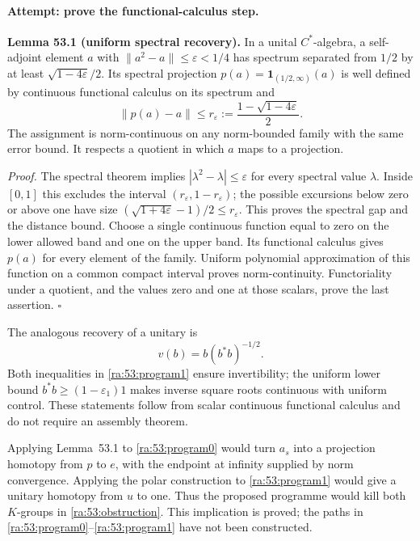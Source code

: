 \documentclass[11pt]{article}
\begin{document}
\paragraph{Attempt: prove the functional-calculus step.}
\textbf{Lemma 53.1 (uniform spectral recovery).} In a unital
$C^*$-algebra, a self-adjoint element $a$ with
$\|a^2-a\|\le\varepsilon<1/4$ has spectrum separated from $1/2$ by at
least $\sqrt{1-4\varepsilon}/2$. Its spectral projection
$p(a)=\mathbf1_{(1/2,\infty)}(a)$ is well defined by continuous
functional calculus on its spectrum and
\begin{equation}\label{ra:53:recovery}
 \|p(a)-a\|\le
 r_\varepsilon:=\frac{1-\sqrt{1-4\varepsilon}}2.
\end{equation}
The assignment is norm-continuous on any norm-bounded family with the
same error bound. It respects a quotient in which $a$ maps to a projection.

\textit{Proof.} The spectral theorem implies
$|\lambda^2-\lambda|\le\varepsilon$ for every spectral value $\lambda$.
Inside $[0,1]$ this excludes the interval
$(r_\varepsilon,1-r_\varepsilon)$; the possible excursions below zero
or above one have size
$(\sqrt{1+4\varepsilon}-1)/2\le r_\varepsilon$.
This proves the spectral gap and the distance bound. Choose a single
continuous function equal to zero on the lower allowed band and one on
the upper band. Its functional calculus gives $p(a)$ for every element
of the family. Uniform polynomial approximation of this function on a
common compact interval proves norm-continuity. Functoriality under a
quotient, and the values zero and one at those scalars, prove the last
assertion. \hfill$\square$

The analogous recovery of a unitary is
\[
 v(b)=b(b^*b)^{-1/2}.
\]
Both inequalities in \eqref{ra:53:program1} ensure invertibility; the
uniform lower bound $b^*b\ge(1-\varepsilon_1)1$ makes inverse square roots
continuous with uniform control. These statements follow from scalar
continuous functional calculus and do not require an assembly theorem.

Applying Lemma~53.1 to \eqref{ra:53:program0} would turn $a_s$ into a
projection homotopy from $p$ to $e$, with the endpoint at infinity supplied
by norm convergence. Applying the polar construction to
\eqref{ra:53:program1} would give a unitary homotopy from $u$ to one.
Thus the proposed programme would kill both $K$-groups in
\eqref{ra:53:obstruction}. This implication is proved; the paths in
\eqref{ra:53:program0}--\eqref{ra:53:program1} have not been constructed.
\end{document}
